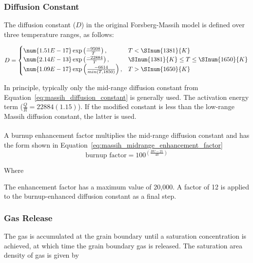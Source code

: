 \subsubsection{Diffusion Constant}\label{section:diffusion-constant}

The diffusion constant (\(D\)) in the original Forsberg-Massih model is
defined over three temperature ranges, as follows:

\begin{equation}
    \label{eq:massih_diffusion_constant}
    D = 
    \begin{cases}
        \num{1.51E-17}\exp\left(\frac{- 9508}{T}\right),          & T < \SInum{1381}{K}               \\
        \num{2.14E-13}\exp\left(\frac{- 22884}{T}\right),         & \SInum{1381}{K} \leq T \leq \SInum{1650}{K} \\
        \num{1.09E-17}\exp\left(\frac{- 6614}{min(T,1850)}\right), & T > \SInum{1650}{K}              \\
    \end{cases}
\end{equation}

In principle, typically only the mid-range diffusion constant from
Equation~\ref{eq:massih_diffusion_constant} is generally used. The activation energy term
(\(\frac{Q}{R} = 22884 (1.15)\)). If the modified constant is less than the low-range Massih
diffusion constant, the latter is used.
\\
\\
A burnup enhancement factor multiplies the mid-range diffusion constant and has the form shown in
Equation~\ref{eq:massih_midrange_enhancement_factor}
\begin{equation}
    \label{eq:massih_midrange_enhancement_factor}
    \text{burnup factor} = 100^{\left( \frac{BU - 21}{40} \right)}
\end{equation}

Where

The enhancement factor has a maximum value of 20,000. A factor of 12 is applied to the
burnup-enhanced diffusion constant as a final step.

\subsubsection{Gas Release}\label{gas-release}

The gas is accumulated at the grain boundary until a saturation concentration is achieved, at which
time the grain boundary gas is released. The saturation area density of gas is given by


